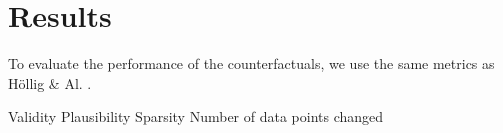 \section{Results}
\label{sec:results}
To evaluate the performance of the counterfactuals, we use the same metrics as Höllig \& Al. \cite{hollig_tsevo_2022}.

Validity
Plausibility
Sparsity
Number of data points changed